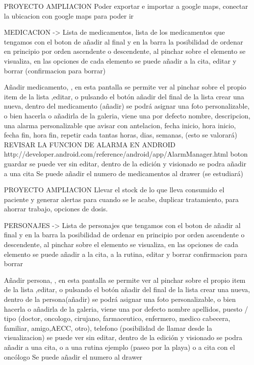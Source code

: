 \documentclass[../pfc.tex]{subfiles}
\begin{document}
	PROYECTO AMPLIACION Poder exportar e importar a google maps, conectar la ubicacion con google maps para poder ir
	
	MEDICACION -> 	Lista de medicamentos, lista de los medicamentos que tengamos con el boton de añadir al final y en la barra la posibilidad de ordenar en principio por orden ascendente o descendente,
	al pinchar sobre el elemento se visualiza, 
	en las opciones de cada elemento se puede añadir a la cita, editar y borrar (confirmacion para borrar)
	
	Añadir medicamento, , en esta pantalla se permite ver al pinchar sobre el propio item de la lista ,editar, o pulsando el botón añadir del final de la lista crear una nueva, 
	dentro del medicamento (añadir) se podrá asignar una foto personalizable, o bien hacerla o añadirla de la galeria, viene una por defecto
	nombre, descripcion, 
	una alarma personalizable que avisar con antelacion, fecha inicio, hora inicio, fecha fin, hora fin, repetir cada tantas horas, dias, semanas, (esto se valorará)
	REVISAR LA FUNCION DE ALARMA EN ANDROID http://developer.android.com/reference/android/app/AlarmManager.html
	boton guardar 
	se puede ver sin editar, 
	dentro de la edición y visionado se podra añadir a una cita
	Se puede añadir el numero de medicamentos al drawer (se estudiará)
	
	PROYECTO AMPLIACION Llevar el stock de lo que lleva consumido el paciente y generar alertas para cuando se le acabe, duplicar tratamiento, para ahorrar trabajo, opciones de dosis.
	
	PERSONAJES -> 	Lista de personajes que tengamos con el boton de añadir al final y en la barra la posibilidad de ordenar en principio por orden ascendente o descendente,
	al pinchar sobre el elemento se visualiza, 
	en las opciones de cada elemento se puede añadir a la cita, a la rutina, editar y borrar confirmacion para borrar
	
	Añadir persona, , en esta pantalla se permite ver al pinchar sobre el propio item de la lista ,editar, o pulsando el botón añadir del final de la lista crear una nueva, 
	dentro de la persona(añadir) se podrá asignar una foto personalizable, o bien hacerla o añadirla de la galeria, viene una por defecto
	nombre apellidos, puesto / tipo (doctor, oncologo, cirujano, farmaceutico, enfermero, medico cabecera, familiar, amigo,AECC, otro), telefono (posibilidad de llamar desde la visualizacion)
	se puede ver sin editar, dentro de la edición y visionado se podra añadir a una cita, o a una rutina ejemplo (paseo por la playa) o a cita con el oncólogo
	Se puede añadir el numero al drawer
	
\end{document}

